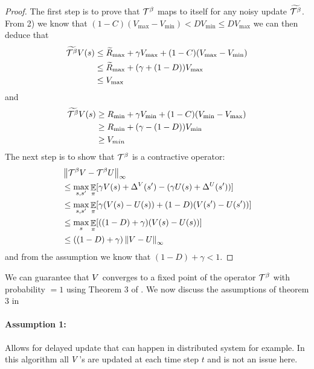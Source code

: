 \begin{proof}
The first step is to prove that $\mathcal{T}^{\beta}$ maps to itself for any noisy update $\widetilde{\mathcal{T}^{\beta}}$. 
From 2) we know that
$(1-C) (V_{\max} - V_{\min}) < D V_{\min} \leq D V_{\max}$ we can then deduce that
\begin{equation}
    \begin{split}
        \widetilde{\mathcal{T}^{\beta}}V(s) &\leq \widetilde{R}_{\max} + \gamma V_{\max} +(1-C)(V_{\max} - V_{\min}) \\
        &\leq \widetilde{R}_{\max} + (\gamma+(1-D)) V_{\max} \\
        &\leq V_{\max}
    \end{split}
\end{equation}
and
\begin{equation}
    \begin{split}
        \widetilde{\mathcal{T}^{\beta}}V(s) &\geq R_{\min} + \gamma V_{\min} + (1-C)(V_{\min} - V_{\max})\\
        &\geq R_{\min} + (\gamma-(1-D)) V_{\min}\\
        &\geq V_{min}\\
    \end{split}
\end{equation}
The next step is to show that $\mathcal{T}^{\beta}$ is a contractive operator:
\begin{equation}
\begin{split}
    &\left\lVert\mathcal{T}^{\beta} V - \mathcal{T}^{\beta}U\right\rVert_{\infty}\\
    &\leq \max_{s,s'}\mathop{\mathbb{E}}_{\pi}[\gamma V(s) + \Delta^V(s') - (\gamma U(s) + \Delta^U(s'))] \\
    &\leq \max_{s,s'}\mathop{\mathbb{E}}_{\pi}[\gamma (V(s)-U(s)) + (1-D)(V(s') -U(s'))]\\
    &\leq \max_{s}\mathop{\mathbb{E}}_{\pi}[((1-D)+\gamma)(V(s) - U(s))]\\
    &\leq ((1-D)+\gamma) \left\lVert V - U\right\rVert_{\infty}
\end{split}
\end{equation}
and from the assumption we know that $(1-D)+\gamma < 1$.
\end{proof}
We can guarantee that $V$ converges to a fixed point of the operator $\mathcal{T}^{\beta}$ with probability $=1$ using Theorem 3 of \citep{tsitsiklis1994asynchronous}. We now discuss the assumptions of theorem 3 in \citep{tsitsiklis1994asynchronous} 
\paragraph{Assumption 1:} Allows for delayed update that can happen in distributed system for example. In this algorithm all $V$'s are updated at each time step $t$ and is not an issue here.
